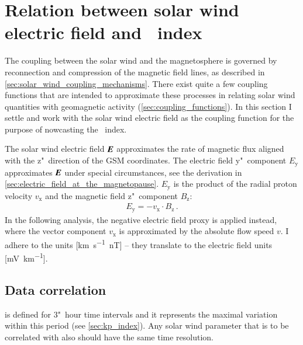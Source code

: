 \section{Relation between solar wind electric field and \Kp~index}
\label{sec:relation_between_sw_efield_and_kp}
The coupling between the solar wind and the magnetosphere is governed by reconnection and compression of the magnetic field lines, as described in \autoref{sec:solar_wind_coupling_mechanisms}. There exist quite a few coupling functions that are intended to approximate these processes in relating solar wind quantities with geomagnetic activity (\autoref{sec:coupling_functions}). In this section I settle and work with the solar wind electric field as the coupling function for the purpose of nowcasting the \Kp~index.

The solar wind electric field $\boldsymbol{E}$ approximates the rate of magnetic flux aligned with the z"~direction of the GSM coordinates. The electric field y"~component $E_\text{y}$ approximates $\boldsymbol{E}$ under special circumstances, see the derivation in \autoref{sec:electric_field_at_the_magnetopause}. $E_\text{y}$ is the product of the radial proton velocity $v_\text{x}$ and the magnetic field z"~component $B_\text{z}$:
\begin{align}
	E_\text{y} = -v_\text{x} \cdot B_\text{z}\,.
\end{align}
In the following analysis, the negative electric field proxy \vBz{} is applied instead, where the vector component $v_\text{x}$ is approximated by the absolute flow speed $v$. I adhere to the units [\si{\km\per\s\nano\tesla}] -- they translate to the electric field units [\si{\milli\volt\per\km}].




\subsection{Data correlation}
\label{sec:data_correlation}
\Kp{} is defined for 3"~hour time intervals and it represents the maximal variation within this period (see \autoref{sec:kp_index}). Any solar wind parameter that is to be correlated with \Kp{} also should have the same time resolution.

